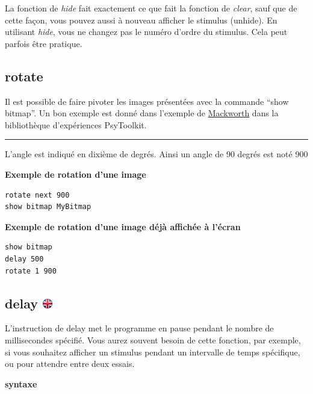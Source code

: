 \documentclass[
]{book}
\begin{document}
La fonction de \emph{hide} fait exactement ce que fait la fonction de
\emph{clear}, sauf que de cette façon, vous pouvez aussi à nouveau
afficher le stimulus (unhide). En utilisant \emph{hide}, vous ne changez
pas le numéro d'ordre du stimulus. Cela peut parfois être pratique.

\hypertarget{rotate}{%
\subsection{rotate}\label{rotate}}

Il est possible de faire pivoter les images présentées avec la commande
``show bitmap''. Un bon exemple est donné dans l'exemple de
\href{http://www.psytoolkit.org/experiment-library/mackworth.html}{Mackworth}
dans la bibliothèque d'expériences PsyToolkit.

\begin{center}\rule{0.5\linewidth}{\linethickness}\end{center}

L'angle est indiqué en dixième de degrés. Ainsi un angle de 90 degrés
est noté 900

\textbf{Exemple de rotation d'une image}

\begin{verbatim}
rotate next 900
show bitmap MyBitmap
\end{verbatim}

\textbf{Exemple de rotation d'une image déjà affichée à l'écran}

\begin{verbatim}
show bitmap
delay 500
rotate 1 900
\end{verbatim}

\hypertarget{delay}{%
\subsection[delay ]{\texorpdfstring{delay
\href{https://www.psytoolkit.org/doc3.2.0/syntax.html\#task-delay}{\protect\includegraphics{img/ukflag.png}}}{delay }}\label{delay}}

L'instruction de delay met le programme en pause pendant le nombre de
millisecondes spécifié. Vous aurez souvent besoin de cette fonction, par
exemple, si vous souhaitez afficher un stimulus pendant un intervalle de
temps spécifique, ou pour attendre entre deux essais.

\textbf{syntaxe}
\end{document}
